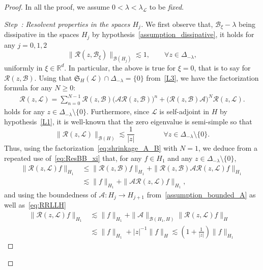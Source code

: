 \documentclass[AHL,Unicode,longabstracts,published]{cedram}
\newcommand{\R}{\mathbb{R}}
\newcommand{\fkS}{\mathfrak{S}}
\renewcommand{\AA}{\mathcal{A}}
\newcommand{\BB}{\mathcal{B}}
\newcommand{\LL}{\mathcal{L}}
\newcommand{\RR}{\mathcal{R}}
\newcommand{\BBB}{\mathscr{B}}
\newcommand{\Ss}{H}
\renewcommand*\ge{\geqslant}
\renewcommand*\leq{\leqslant}
\newcounter{stepcount}
\newenvironment{step}[1]{\refstepcounter{stepcount}\begin{proof}[Step~\thestepcount: #1]}{\let\qed\relax\end{proof}}
\let\oldforall\forall
\renewcommand*{\forall}{\mathrel{\oldforall}}
\begin{document}
\begin{proof}
In all the proof, we assume $0 < \lambda < \lambda_\LL$ to be \emph{fixed}.

\begin{step}{{Resolvent properties in the spaces $\Ss_j$}}
We first observe that, $\BB_{\xi} - \lambda$ being dissipative in the spaces $\Ss_j$ by hypothesis~\eqref{assumption_dissipative}, it holds for any $j = 0, 1, 2$
\begin{equation}\label{eq:ResBB_xi}
\|\RR(z,\BB_{\xi})\|_{\BBB(\Ss_{j})} \lesssim 1, \qquad \forall z \in \Delta_{-\lambda},
\end{equation}
uniformly in $\xi \in \R^{d}$. In particular, the above is true for $\xi=0$, that is to say for $\RR(z,\BB)$. Using that $\fkS_{\Ss}\left(\LL\right) \cap \Delta_{-\lambda} = \{0\}$ from~\eqref{L3}, we have the factorization formula for any $N \ge 0$:
\begin{gather}\label{eq:shrinkage_A_B}
\RR(z,\LL) = \sum_{n = 0}^{N-1} \RR(z,\BB) \Big(\AA \RR(z,\BB) \Big)^n + \Big(\RR(z,\BB) \AA \Big)^N \RR(z,\LL).
\end{gather}
holds for any $z \in \Delta_{-\lambda} \setminus\{0\}.$ Furthermore, since $\LL$ is self-adjoint in $\Ss$ by hypothesis~\eqref{L1}, it is well-known that the zero eigenvalue is semi-simple so that
\begin{equation}\label{eq:RRLLH}
\|\RR(z,\LL)\|_{\BBB(\Ss)} \lesssim \frac{1}{|z|} \qquad \qquad
\forall z \in \Delta_{-\lambda}\setminus\{0\}.
\end{equation}
Thus, using the factorization~\eqref{eq:shrinkage_A_B} with $N=1$, we deduce from a repeated use of~\eqref{eq:ResBB_xi} that, for any $f \in \Ss_{1}$ and any $z \in \Delta_{-\lambda}\setminus\{0\}$,
\begin{align*}
\|\RR(z,\LL)f\|_{\Ss_{1}} &\leq \|\RR(z,\BB)f\|_{\Ss_{1}} + \|\RR(z,\BB)\AA\RR(z,\LL)f\|_{\Ss_{1}}
\\
&\lesssim \|f\|_{\Ss_{1}} +\|\AA\RR(z,\LL)f\|_{\Ss_{1}},
\end{align*}
and using the boundedness of $\AA : \Ss_j \to \Ss_{j+1}$ from~\eqref{assumption_bounded_A} as well as~\eqref{eq:RRLLH}
\begin{align*}
\|\RR(z,\LL)f\|_{\Ss_{1}} & \lesssim \|f\|_{\Ss_{1}} + \|\AA\|_{\BBB(\Ss_{1},\Ss)}\|\RR(z,\LL)f\|_{\Ss}\\
&\lesssim \|f\|_{\Ss_{1}}+ |z|^{-1}\|f\|_{\Ss} \lesssim \left(1+\frac{1}{|z|}\right)\|f\|_{\Ss_{1}}
\end{align*}

\end{step}
\end{proof}
\end{document}
